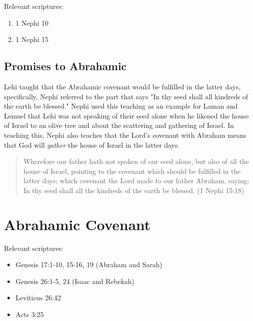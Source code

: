 Relevant scriptures:
\begin{enumerate}
  \item 1 Nephi 10
  \item 1 Nephi 15
\end{enumerate}

\subsection{Promises to Abrahamic}

Lehi taught that the Abrahamic covenant would be fulfilled in the latter days, specifically, Nephi referred to the part that says "In thy seed shall all kindreds of the earth be blessed." Nephi used this teaching as an example for Laman and Lemuel that Lehi was not speaking of their seed alone when he likened the house of Israel to an olive tree and about the scattering and gathering of Israel. In teaching this, Nephi also teaches that the Lord's covenant with Abraham means that God will \textit{gather} the house of Israel in the latter days.

\begin{quotation}
Wherefore our father hath not spoken of our seed alone, but also of all the house of Israel, pointing to the covenant which should be fulfilled in the latter days; which covenant the Lord made to our father Abraham, saying: In thy seed shall all the kindreds of the earth be blessed. (1 Nephi 15:18)
\end{quotation}

\section{Abrahamic Covenant}
Relevant scriptures:
\begin{itemize}
  \item Genesis 17:1-10, 15-16, 19 (Abraham and Sarah)
  \item Genesis 26:1-5, 24 (Isaac and Rebekah)
  \item Leviticus 26:42
  \item Acts 3:25
\end{itemize}
